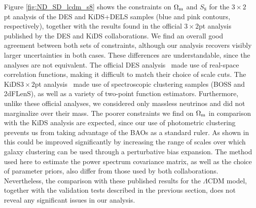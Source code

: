 \documentclass[a4paper,11pt]{article}
\newcommand{\Om}{\Omega_{\rm m}}
\newcommand{\lcdm}{$\Lambda$CDM\xspace}
\newcommand{\des}{DES\xspace}
\newcommand{\kids}{KiDS\xspace}
\newcommand{\dls}{DELS\xspace}
\begin{document}
      Figure \ref{fig:ND_SD_lcdm_s8} shows the constraints on $\Om$ and $S_8$ for the $3\times2$pt analysis of the \des and \kids+\dls samples (blue and pink contours, respectively), together with the results found in the official $3\times2$pt analysis published by the \des and \kids collaborations. We find an overall good agreement between both sets of constraints, although our analysis recovers visibly larger uncertainties in both cases. These differences are understandable, since the analyses are not equivalent. The official \des analysis~\cite{1708.01530} made use of real-space correlation functions, making it difficult to match their choice of scale cuts. The \kids $3\times2$pt analysis~\cite{2007.15632} made use of spectroscopic clustering samples (BOSS and 2dFLenS), as well as a variety of two-point function estimators. Furthermore, unlike these official analyses, we considered only massless neutrinos and did not marginalize over their mass. The poorer constraints we find on $\Om$ in comparison with the \kids analysis are expected, since our use of photometric clustering prevents us from taking advantage of the BAOs as a standard ruler. As shown in \cite{2103.09820} this could be improved significantly by increasing the range of scales over which galaxy clustering can be used through a perturbative bias expansion. The method used here to estimate the power spectrum covariance matrix, as well as the choice of parameter priors, also differ from those used by both collaborations. Nevertheless, the comparison with these published results for the \lcdm model, together with the validation tests described in the previous section, does not reveal any significant issues in our analysis.
\end{document}
